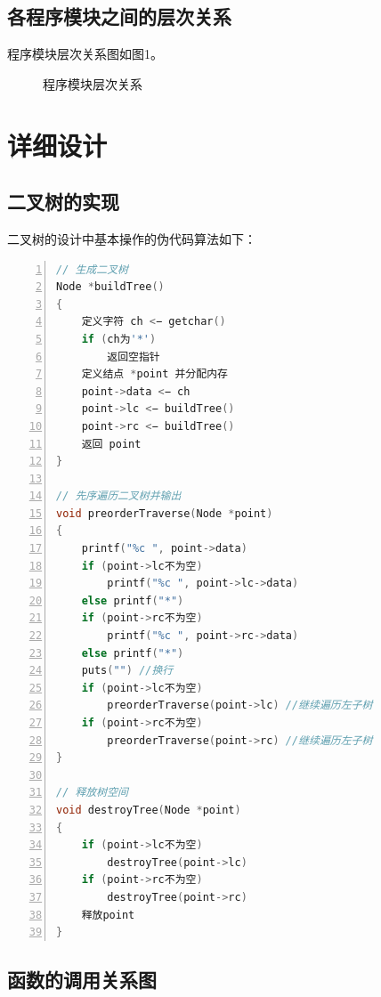 \documentclass{article}
\begin{document}
\subsection{各程序模块之间的层次关系}

程序模块层次关系图如图1。

\begin{figure}[htbp]


    \caption{程序模块层次关系}

\end{figure}

\section{详细设计}

\subsection{二叉树的实现}

二叉树的设计中基本操作的伪代码算法如下：

\begin{lstlisting}[language={C},
    numbers=left,
    numberstyle=\tiny\consolas,
    basicstyle=\small\consolas]
// 生成二叉树
Node *buildTree()
{
    定义字符 ch <− getchar()
    if (ch为'*')
        返回空指针
    定义结点 *point 并分配内存
    point->data <− ch
    point->lc <− buildTree()
    point->rc <− buildTree()
    返回 point
}
    
// 先序遍历二叉树并输出
void preorderTraverse(Node *point)
{
    printf("%c ", point->data)
    if (point->lc不为空)
        printf("%c ", point->lc->data)
    else printf("*")
    if (point->rc不为空)
        printf("%c ", point->rc->data)
    else printf("*")
    puts("") //换行
    if (point->lc不为空)
        preorderTraverse(point->lc) //继续遍历左子树
    if (point->rc不为空)
        preorderTraverse(point->rc) //继续遍历左子树
}

// 释放树空间
void destroyTree(Node *point)
{
    if (point->lc不为空)
        destroyTree(point->lc)
    if (point->rc不为空)
        destroyTree(point->rc)
    释放point
}
\end{lstlisting}

\subsection{函数的调用关系图}
\end{document}
